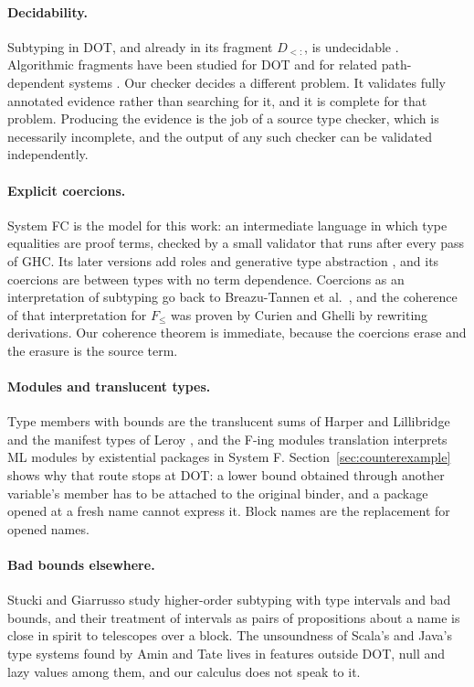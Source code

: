\paragraph{Decidability.}
Subtyping in DOT, and already in its fragment $D_{<:}$, is undecidable \cite{hu2020undecidability}. Algorithmic fragments have been studied for DOT \cite{nieto2017algorithmic} and for related path-dependent systems \cite{mackay2020decidable}. Our checker decides a different problem. It validates fully annotated evidence rather than searching for it, and it is complete for that problem. Producing the evidence is the job of a source type checker, which is necessarily incomplete, and the output of any such checker can be validated independently.

\paragraph{Explicit coercions.}
System FC \cite{sulzmann2007fc} is the model for this work: an intermediate language in which type equalities are proof terms, checked by a small validator that runs after every pass of GHC. Its later versions add roles \cite{breitner2016safe} and generative type abstraction \cite{weirich2011generative}, and its coercions are between types with no term dependence. Coercions as an interpretation of subtyping go back to Breazu-Tannen et al.\ \cite{breazu1991inheritance}, and the coherence of that interpretation for $F_{\le}$ was proven by Curien and Ghelli \cite{curien1992coherence} by rewriting derivations. Our coherence theorem is immediate, because the coercions erase and the erasure is the source term.

\paragraph{Modules and translucent types.}
Type members with bounds are the translucent sums of Harper and Lillibridge \cite{harper1994translucent} and the manifest types of Leroy \cite{leroy1994manifest}, and the F-ing modules translation \cite{rossberg2014fing} interprets ML modules by existential packages in System F. Section~\ref{sec:counterexample} shows why that route stops at DOT: a lower bound obtained through another variable's member has to be attached to the original binder, and a package opened at a fresh name cannot express it. Block names are the replacement for opened names.

\paragraph{Bad bounds elsewhere.}
Stucki and Giarrusso \cite{stucki2021intervals} study higher-order subtyping with type intervals and bad bounds, and their treatment of intervals as pairs of propositions about a name is close in spirit to telescopes over a block. The unsoundness of Scala's and Java's type systems found by Amin and Tate \cite{amin2016unsound} lives in features outside DOT, null and lazy values among them, and our calculus does not speak to it.
